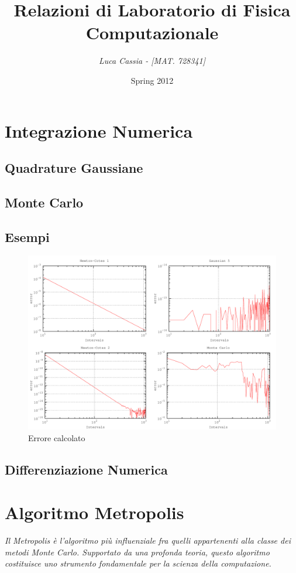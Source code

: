 \documentclass[a4paper,11pt]{report}
\title{\bfseries{\Huge{Relazioni di Laboratorio di Fisica Computazionale}}}
\author{\textit {Luca Cassia - [MAT. 728341]}}
\date{Spring 2012}
\begin{document}
\maketitle
\tableofcontents

\chapter{\huge Integrazione Numerica}

\section{Quadrature Gaussiane}
\section{Monte Carlo}

\section{Esempi}
\begin{figure}[h]
\centering
\includegraphics[width=\textwidth]{integral}
\caption{Errore calcolato}
\label{fig:integral}
\end{figure}

\section{Differenziazione Numerica}

\chapter{\huge Algoritmo Metropolis}
\textit{Il Metropolis è l'algoritmo più influenziale fra quelli appartenenti alla classe dei metodi Monte Carlo. Supportato da una profonda teoria, questo algoritmo costituisce uno strumento fondamentale per la scienza della computazione.}
\end{document}
